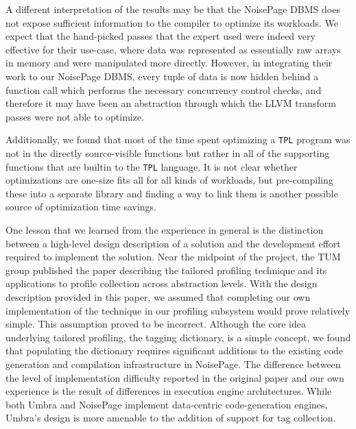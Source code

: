 \documentclass{vldb}
\newcommand{\tpl}{\texttt{TPL}\xspace}
\begin{document}
A different interpretation of the results may be that the NoisePage DBMS does not expose sufficient information to the compiler to optimize its workloads. We expect that the hand-picked passes that the expert used were indeed very effective for their use-case, where data was represented as essentially raw arrays in memory and were manipulated more directly. However, in integrating their work to our NoisePage DBMS, every tuple of data is now hidden behind a function call which performs the necessary concurrency control checks, and therefore it may have been an abstraction through which the LLVM transform passes were not able to optimize.

Additionally, we found that most of the time spent optimizing a \tpl program was not in the directly source-visible functions but rather in all of the supporting functions that are builtin to the \tpl language. It is not clear whether optimizations are one-size fits all for all kinds of workloads, but pre-compiling these into a separate library and finding a way to link them is another possible source of optimization time savings.

One lesson that we learned from the experience in general is the distinction between a high-level design description of a solution and the development effort required to implement the solution. Near the midpoint of the project, the TUM group published the paper describing the tailored profiling technique and its applications to profile collection across abstraction levels. With the design description provided in this paper, we assumed that completing our own implementation of the technique in our profiling subsystem would prove relatively simple. This assumption proved to be incorrect. Although the core idea underlying tailored profiling, the tagging dictionary, is a simple concept, we found that populating the dictionary requires significant additions to the existing code generation and compilation infrastructure in NoisePage. The difference between the level of implementation difficulty reported in the original paper \cite{beischl21} and our own experience is the result of differences in execution engine architectures. While both Umbra \cite{umbra} and NoisePage implement data-centric code-generation engines, Umbra’s design is more amenable to the addition of support for tag collection.

\end{document}

